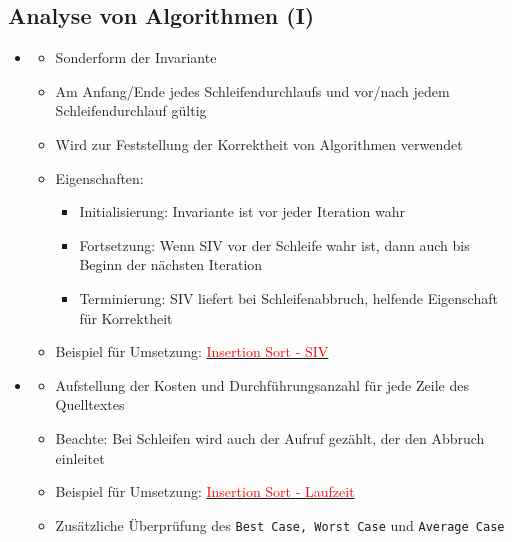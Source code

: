 \documentclass[
    12pt,
    a4paper,
    ngerman,
    color=3b,%
    marginpar=false,
    colorback=false,
    leqno,
]{tudaexercise}
\begin{document}
\subsection{Analyse von Algorithmen \textmd{(I)}}\label{Analyse von Algorithmen 1}
\begin{itemize}

    \item {}
          \begin{itemize}
              \item Sonderform der Invariante
              \item Am Anfang/Ende jedes Schleifendurchlaufs und vor/nach jedem Schleifendurchlauf gültig
              \item Wird zur Feststellung der Korrektheit von Algorithmen verwendet
              \item Eigenschaften:
                    \begin{itemize}
                        \item Initialisierung: Invariante ist vor jeder Iteration wahr
                        \item Fortsetzung: Wenn SIV vor der Schleife wahr ist, dann auch bis Beginn der nächsten Iteration
                        \item Terminierung: SIV liefert bei Schleifenabbruch, helfende Eigenschaft für Korrektheit
                    \end{itemize}
              \item Beispiel für Umsetzung: \hyperref[insSortSiv]{\textcolor{red}{Insertion Sort - SIV}}
          \end{itemize}

    \item {}
          \begin{itemize}
              \item Aufstellung der Kosten und Durchführungsanzahl für jede Zeile des Quelltextes
              \item Beachte: Bei Schleifen wird auch der Aufruf gezählt, der den Abbruch einleitet
              \item Beispiel für Umsetzung: \hyperref[insSortLaufzeit]{\textcolor{red}{Insertion Sort - Laufzeit}}
              \item Zusätzliche Überprüfung des \texttt{Best Case, Worst Case} und \texttt{Average Case}
          \end{itemize}


\end{itemize}
\end{document}
